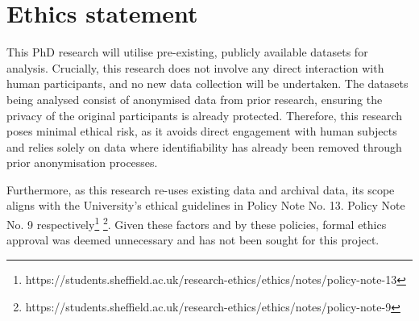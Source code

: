 \documentclass[10pt,oneside]{book}
\begin{document}



\section{Ethics statement}\label{sec:ethics}

This PhD research will utilise pre-existing, publicly available datasets for analysis. Crucially, this research does not involve any direct interaction with human participants, and no new data collection will be undertaken. The datasets being analysed consist of anonymised data from prior research, ensuring the privacy of the original participants is already protected. Therefore, this research poses minimal ethical risk, as it avoids direct engagement with human subjects and relies solely on data where identifiability has already been removed through prior anonymisation processes.

Furthermore, as this research re-uses existing data and archival data, its scope aligns with the University's ethical guidelines in Policy Note No. 13. Policy Note No. 9 respectively\footnote{https://students.sheffield.ac.uk/research-ethics/ethics/notes/policy-note-13} \footnote{https://students.sheffield.ac.uk/research-ethics/ethics/notes/policy-note-9}. Given these factors and by these policies, formal ethics approval was deemed unnecessary and has not been sought for this project.
\end{document}

